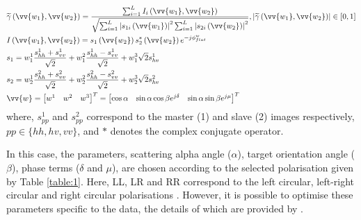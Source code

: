 \documentclass[review]{elsarticle}
\numberwithin{equation}{section}
\numberwithin{figure}{section}
\numberwithin{table}{section}
\begin{document}
\begin{subequations}
    \centering
    \begin{align}
        \label{seq:coh} 
        & \widetilde{\gamma}\left(\vv{w_1}, \vv{w_2}\right) = \frac{\sum_{i=1}^LI_i\left(\vv{w_1}, \vv{w_2}\right)}{\sqrt{\sum_{i=1}^L\left\lvert s_{1i}\left(\vv{w_1}\right)\right\rvert^2\sum_{i=1}^L\left\lvert s_{2i}\left(\vv{w_2}\right)\right\rvert^2}}, \left\lvert\widetilde{\gamma}\left(\vv{w_1}, \vv{w_2}\right)\right\rvert  \in [0, 1] \\
        \label{seq:ifg} 
        & I\left(\vv{w_1}, \vv{w_2}\right) = s_1\left(\vv{w_2}\right)s_2^*\left(\vv{w_2}\right)e^{-j\phi_{flat}^w} \\
        \label{seq:s1} 
        & s_1 = w_1^1\frac{s_{hh}^1 + s_{vv}^1}{\sqrt{2}} + w_1^2\frac{s_{hh}^1 - s_{vv}^1}{\sqrt{2}} + w_1^3\sqrt{2}s_{hv}^1 \\
        \label{seq:s2} 
        & s_2 = w_2^1\frac{s_{hh}^2 + s_{vv}^2}{\sqrt{2}} + w_2^2\frac{s_{hh}^2 - s_{vv}^2}{\sqrt{2}} + w_2^3\sqrt{2}s_{hv}^2 \\
        \label{seq:weight}
        & \vv{w} = \begin{bmatrix}
                    w^1 & w^2 & w^3
                    \end{bmatrix}^T = \begin{bmatrix}
                    \cos\alpha & \sin\alpha \cos{\beta{e}^{j\delta}} & \sin\alpha\sin{\beta{e}^{j\mu}}
                    \end{bmatrix}^T
    \end{align}
\end{subequations}
where, $s_{pp}^1$ and $s_{pp}^2$ correspond to the master (1) and slave (2) images respectively, $pp \in \{hh, hv, vv\}$,
and $*$ denotes the complex conjugate operator.

In this case, the parameters, scattering alpha angle ($\alpha$), target orientation angle ($\beta$), phase terms ($\delta$ and $\mu$), are chosen according to the selected polarisation given by Table \ref{table:1}. Here, LL, LR and RR correspond to the left circular, left-right circular and right circular polarisations \citep{Cloude2010}. However, it is possible to optimise these parameters specific to the data, the details of which are provided by \cite{Cloude2010}.
\end{document}
